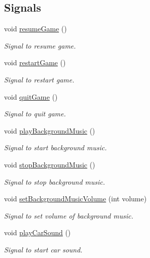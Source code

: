 \subsection*{Signals}
\begin{DoxyCompactItemize}
\item 
void \mbox{\hyperlink{class_pause_menu_a294b2f57ecba7ee42a871f1c6ed614eb}{resume\+Game}} ()
\begin{DoxyCompactList}\small\item\em Signal to resume game. \end{DoxyCompactList}\item 
void \mbox{\hyperlink{class_pause_menu_a0e589c9e7ac92ad7a9478b100f2b94c1}{restart\+Game}} ()
\begin{DoxyCompactList}\small\item\em Signal to restart game. \end{DoxyCompactList}\item 
void \mbox{\hyperlink{class_pause_menu_a1db9704223355ed9ea8fa011d6c669ed}{quit\+Game}} ()
\begin{DoxyCompactList}\small\item\em Signal to quit game. \end{DoxyCompactList}\item 
void \mbox{\hyperlink{class_pause_menu_ae1b441da8a1a0ae3ffc64a8ce89432f0}{play\+Background\+Music}} ()
\begin{DoxyCompactList}\small\item\em Signal to start background music. \end{DoxyCompactList}\item 
void \mbox{\hyperlink{class_pause_menu_a06f6d713caf70ef71c3bde13e4873a7c}{stop\+Background\+Music}} ()
\begin{DoxyCompactList}\small\item\em Signal to stop background music. \end{DoxyCompactList}\item 
void \mbox{\hyperlink{class_pause_menu_ad0c8d82848648993031ece9694b236d2}{set\+Background\+Music\+Volume}} (int volume)
\begin{DoxyCompactList}\small\item\em Signal to set volume of background music. \end{DoxyCompactList}\item 
void \mbox{\hyperlink{class_pause_menu_aafbc3cdef6e016d6ac9c6c21a45c03b9}{play\+Car\+Sound}} ()
\begin{DoxyCompactList}\small\item\em Signal to start car sound. \end{DoxyCompactList}\item 

\end{DoxyCompactItemize}
